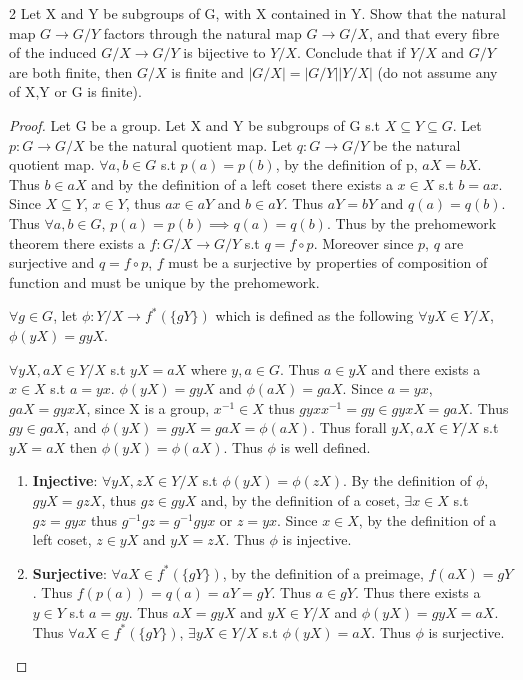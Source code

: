 \documentclass{article}
\begin{document}
\begin{PROB}{2}\label{Problem 2.}
    Let X and Y be subgroups of G, with X contained in Y. Show that the natural map $G \to G/Y$ factors through the natural map $G \to G/X$, and that every fibre of the induced $G/X \to G/Y$ is bijective to $Y/X$.  Conclude that if $Y/X$ and $G/Y$ are both finite, then $G/X$ is finite and $|G/X| = |G/Y||Y/X|$ (do not assume any of X,Y or G is finite). 
\end{PROB}
\begin{proof}
    Let G be a group. Let X and Y be subgroups of G s.t $X \subseteq Y \subseteq G$.
    Let $p: G \to G/X$ be the natural quotient map. Let $q: G \to G/Y$ be the natural quotient map. $\forall a, b \in G$ s.t $p(a) = p(b)$, by the definition of p, $aX = bX$. Thus $b \in aX$ and by the definition of a left coset there exists a $x \in X$ s.t $b = ax$. Since $X \subseteq Y$, $x \in Y$, thus $ax \in aY$ and $b \in aY$. Thus $aY = bY$ and $q(a) = q(b)$. Thus $\forall a, b \in G$, $p(a) = p(b) \implies q(a) = q(b)$. Thus by the prehomework theorem there exists a $f: G/X \to G/Y$ s.t $q = f \circ p$. Moreover since $p$, $q$ are surjective and $q = f \circ p$, $f$ must be a surjective by properties of composition of function and must be unique by the prehomework.

    $\forall g \in G$, let $\phi: Y/X \to f^*(\{gY\})$ which is defined as the following $\forall yX \in Y/X$, $\phi(yX) = gyX$. 

    $\forall yX, aX \in Y/X$ s.t $yX = aX$ where $y, a \in G$. Thus $a \in yX$ and there exists a $x \in X$ s.t $a = yx$. $\phi(yX) = gyX$ and $\phi(aX) = gaX$. Since $a = yx$, $gaX = gyxX$, since X is a group, $x^{-1} \in X$ thus $gyxx^{-1} = gy \in gyxX = gaX$. Thus $gy \in gaX$, and $\phi(yX) = gyX = gaX = \phi(aX)$. Thus forall $yX, aX \in Y/X$ s.t $yX = aX$ then $\phi(yX) = \phi(aX)$. Thus $\phi$ is well defined.

    \begin{enumerate}{}
        \item \textbf{Injective}: $\forall yX, zX \in Y/X$ s.t $\phi(yX) = \phi(zX)$. By the definition of $\phi$, $gyX = gzX$, thus $gz \in gyX$ and, by the definition of a coset, $\exists x \in X$ s.t $gz = gyx$ thus $g^{-1}gz = g^{-1}gyx$ or $z = yx$. Since $x \in X$, by the definition of a left coset, $z \in yX$ and $yX = zX$. Thus $\phi$ is injective.
        
        \item \textbf{Surjective}: $\forall aX \in f^*(\{gY\})$, by the definition of a preimage, $f(aX) = gY$. Thus $f(p(a)) = q(a) = aY = gY$. Thus $a \in gY$. Thus there exists a $y \in Y$ s.t $a = gy$. Thus $aX = gyX$ and $yX \in Y/X$ and $\phi(yX) = gyX = aX$. Thus $\forall aX \in f^*(\{gY\})$, $\exists yX \in Y/X$ s.t $\phi(yX) = aX$. Thus $\phi$ is surjective.
    \end{enumerate}


\end{proof}
\end{document}
